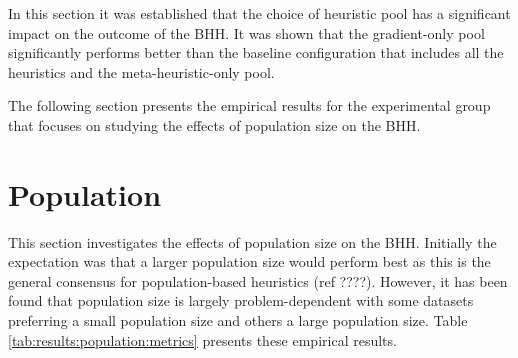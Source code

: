 In this section it was established that the choice of heuristic pool has a significant impact on the outcome of the \Ac{BHH}. It was shown that the gradient-only pool significantly performs better than the baseline configuration that includes all the heuristics and the meta-heuristic-only pool.

The following section presents the empirical results for the experimental group that focuses on studying the effects of population size on the \Ac{BHH}.




\section{Population}
\label{sec:results:population}

This section investigates the effects of population size on the \Ac{BHH}. Initially the expectation was that a larger population size would perform best as this is the general consensus for population-based heuristics (ref ????). However, it has been found that population size is largely problem-dependent with some datasets preferring a small population size and others a large population size. Table \ref{tab:results:population:metrics} presents these empirical results.

